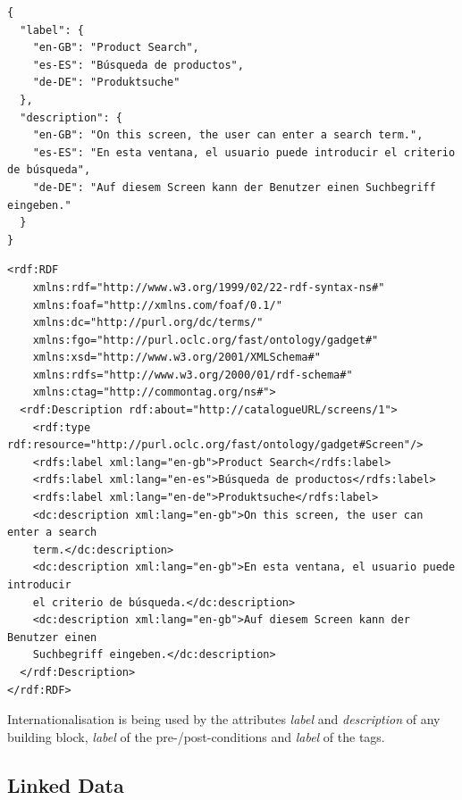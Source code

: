 \documentclass{fast_latex}
\begin{document}
\singlespacing
\begin{verbatim}
{
  "label": {
    "en-GB": "Product Search",
    "es-ES": "Búsqueda de productos",
    "de-DE": "Produktsuche"
  },
  "description": {
    "en-GB": "On this screen, the user can enter a search term.",
    "es-ES": "En esta ventana, el usuario puede introducir el criterio de búsqueda",
    "de-DE": "Auf diesem Screen kann der Benutzer einen Suchbegriff eingeben."
  }
}
\end{verbatim}
\doublespacing

\singlespacing
\begin{verbatim}
<rdf:RDF
    xmlns:rdf="http://www.w3.org/1999/02/22-rdf-syntax-ns#"
    xmlns:foaf="http://xmlns.com/foaf/0.1/"
    xmlns:dc="http://purl.org/dc/terms/"
    xmlns:fgo="http://purl.oclc.org/fast/ontology/gadget#"
    xmlns:xsd="http://www.w3.org/2001/XMLSchema#"
    xmlns:rdfs="http://www.w3.org/2000/01/rdf-schema#"
    xmlns:ctag="http://commontag.org/ns#">
  <rdf:Description rdf:about="http://catalogueURL/screens/1">
    <rdf:type rdf:resource="http://purl.oclc.org/fast/ontology/gadget#Screen"/>
    <rdfs:label xml:lang="en-gb">Product Search</rdfs:label>
    <rdfs:label xml:lang="en-es">Búsqueda de productos</rdfs:label>
    <rdfs:label xml:lang="en-de">Produktsuche</rdfs:label>
    <dc:description xml:lang="en-gb">On this screen, the user can enter a search
    term.</dc:description>
    <dc:description xml:lang="en-gb">En esta ventana, el usuario puede introducir
    el criterio de búsqueda.</dc:description>
    <dc:description xml:lang="en-gb">Auf diesem Screen kann der Benutzer einen
    Suchbegriff eingeben.</dc:description>
  </rdf:Description>
</rdf:RDF>
\end{verbatim}
\doublespacing

Internationalisation is being used by the attributes \emph{label} and \emph{description} of any building block, \emph{label} of the pre-/post-conditions and \emph{label} of the tags.


\subsection{Linked Data} %
\label{sub:linked_data}
\end{document}
